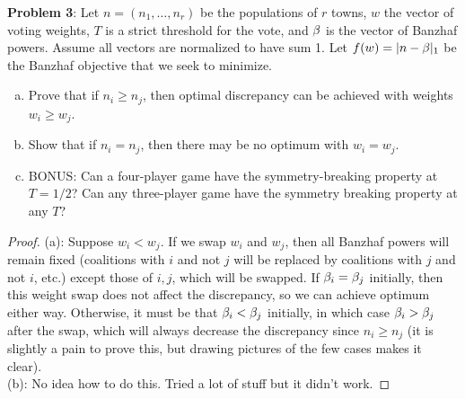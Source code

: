 \documentclass{amsart}
\begin{document}
	\textbf{Problem 3}: Let $n=(n_1,\dots,n_r)$ be the populations of $r$ towns, $w$ the vector of voting weights, $T$ is a strict threshold for the vote, and $\beta$ is the vector of Banzhaf powers. Assume all vectors are normalized to have sum 1. Let $f(w)=|n-\beta|_1$ be the Banzhaf objective that we seek to minimize.
	\begin{enumerate}[(a)]
		\item Prove that if $n_i\geq n_j$, then optimal discrepancy can be achieved with weights $w_i\geq w_j$.
		\item Show that if $n_i=n_j$, then there may be no optimum with $w_i=w_j$.
		\item BONUS: Can a four-player game have the symmetry-breaking property at $T=1/2$? Can any three-player game have the symmetry breaking property at any $T$?\\
	\end{enumerate}
	\begin{proof}
		(a): Suppose $w_i<w_j$. If we swap $w_i$ and $w_j$, then all Banzhaf powers will remain fixed (coalitions with $i$ and not $j$ will be replaced by coalitions with $j$ and not $i$, etc.) except those of $i,j$, which will be swapped. If $\beta_i=\beta_j$ initially, then this weight swap does not affect the discrepancy, so we can achieve optimum either way. Otherwise, it must be that $\beta_i<\beta_j$ initially, in which case $\beta_i>\beta_j$ after the swap, which will always decrease the discrepancy since $n_i\geq n_j$ (it is slightly a pain to prove this, but drawing pictures of the few cases makes it clear).\\
		
		(b): No idea how to do this. Tried a lot of stuff but it didn't work.
		
%		
%		
%		
	\end{proof}
	
\end{document}
